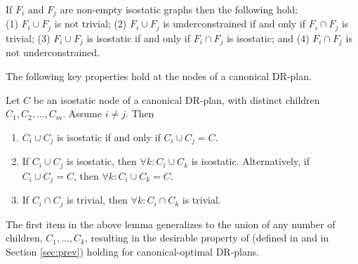 \begin{observation*}\label{lemma:union_intersection}
If $F_i$ and $F_j$ are non-empty isostatic graphs then the following hold: \\
(1) $F_i\cup F_j$ is not trivial;
(2) $F_i\cup F_j$ is underconstrained if and only if $F_i\cap F_j$ is trivial;
(3) $F_i\cup F_j$ is isostatic if and only if $F_i\cap F_j$ is isostatic; and
(4) $F_i\cap F_j$ is not underconstrained.
\end{observation*}

The following key properties hold at the nodes of a canonical DR-plan.

\begin{lemma*}\label{lemma:combined_lemma}
Let $C$ be an isostatic node of a canonical DR-plan, with distinct children $C_1,C_2,\ldots, C_m$. Assume $i\ne j$.
Then
\begin{enumerate}
    \item\label{lemma:wc_intersection_is_C}
    $C_i\cup C_j$ is isostatic if and only if $C_i\cup C_j = C$.

    \item\label{lemma:wc_intersection_makes_all_wc}
    If $C_i\cup C_j$ is isostatic, then $\forall k: C_i\cup C_k$ is isostatic. Alternatively, if $C_i\cup C_j=C$, then $\forall k: C_i\cup C_k=C$.

    \item\label{lemma:uc_intersection_makes_all_uc}
    If $C_i\cap C_j$ is trivial, then $\forall k: C_i\cap C_k$ is trivial.
\end{enumerate}
\end{lemma*}

\begin{remark}
The first item in the above lemma generalizes to the union of any number of children, $C_1,\ldots,C_k$, resulting in the desirable property of  (defined in \cite{hoffman2001decompositionI} and in Section \ref{sec:prev}) holding for  canonical-optimal DR-plans.
\end{remark}





%     
%     

